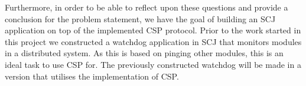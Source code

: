Furthermore, in order to be able to reflect upon these questions and provide a conclusion for the problem statement, we have the goal of building an SCJ application on top of the implemented CSP protocol. Prior to the work started in this project we constructed a watchdog application in SCJ that monitors modules in a distributed system. As this is based on pinging other modules, this is an ideal task to use CSP for. The previously constructed watchdog will be made in a version that utilises the implementation of CSP.





